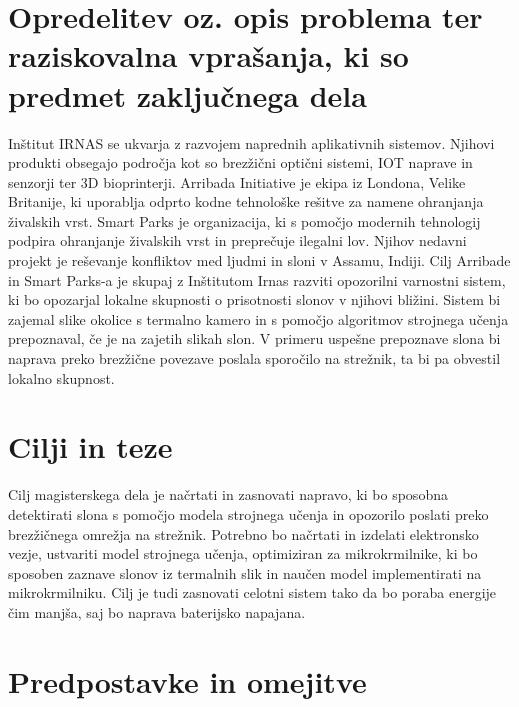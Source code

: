 \documentclass[a4paper,12pt]{article}
\begin{document}


\section{ Opredelitev oz. opis problema ter raziskovalna vprašanja, ki so predmet zaključnega dela}

Inštitut IRNAS se ukvarja z razvojem naprednih aplikativnih sistemov. 
Njihovi produkti obsegajo področja kot so brezžični optični sistemi, IOT naprave in senzorji ter 3D bioprinterji. 
Arribada Initiative je ekipa iz Londona, Velike Britanije, ki uporablja odprto kodne tehnološke rešitve za namene ohranjanja živalskih vrst. 
Smart Parks je organizacija, ki s pomočjo modernih tehnologij podpira ohranjanje živalskih vrst in preprečuje ilegalni lov. 
Njihov nedavni projekt je reševanje konfliktov med ljudmi in sloni v Assamu, Indiji. Cilj Arribade in Smart Parks-a je skupaj z Inštitutom Irnas razviti opozorilni varnostni sistem, ki bo opozarjal lokalne skupnosti o prisotnosti slonov v njihovi bližini. 
Sistem bi zajemal slike okolice s termalno kamero in s pomočjo algoritmov strojnega učenja prepoznaval, če je na zajetih slikah slon. 
V primeru uspešne prepoznave slona bi naprava preko brezžične povezave poslala sporočilo na strežnik, ta bi pa obvestil lokalno skupnost.

\vspace{\baselineskip}


\section{ Cilji in teze}

Cilj magisterskega dela je načrtati in zasnovati napravo, ki bo sposobna detektirati slona s pomočjo modela strojnega učenja in opozorilo poslati preko brezžičnega omrežja na strežnik. 
Potrebno bo načrtati in izdelati elektronsko vezje, ustvariti model strojnega učenja, optimiziran za mikrokrmilnike, ki bo sposoben zaznave slonov iz termalnih slik in naučen model implementirati na mikrokrmilniku. Cilj je tudi zasnovati celotni sistem tako da bo poraba energije čim manjša, saj bo naprava baterijsko napajana.

\vspace{\baselineskip}


\section{ Predpostavke in omejitve}
\end{document}
